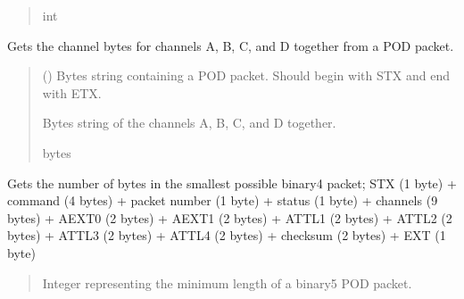 \documentclass[letterpaper,10pt,english]{sphinxmanual}
\begin{document}
\begin{fulllineitems}
\begin{fulllineitems}
\begin{quote}
\begin{description}
\sphinxAtStartPar
int

\end{description}\end{quote}

\end{fulllineitems}


\begin{fulllineitems}
\label{\detokenize{Morelia.Packets:Morelia.Packets.Binary5.PacketBinary5.GetChannels}}
\pysigstartsignatures
{}
\pysigstopsignatures
\sphinxAtStartPar
Gets the channel bytes for channels A, B, C, and D together from a POD packet.
\begin{quote}\begin{description}
\sphinxAtStartPar
{} () \textendash{} Bytes string containing a POD packet. Should begin with STX and                 end with ETX.

\sphinxAtStartPar
Bytes string of the channels A, B, C, and D together.

\sphinxAtStartPar
bytes

\end{description}\end{quote}

\end{fulllineitems}


\begin{fulllineitems}
\label{\detokenize{Morelia.Packets:Morelia.Packets.Binary5.PacketBinary5.GetMinimumLength}}
\pysigstartsignatures
{}
\pysigstopsignatures
\sphinxAtStartPar
Gets the number of bytes in the smallest possible binary4 packet;         STX (1 byte) + command (4 bytes) + packet number (1 byte) + status (1 byte)         + channels (9 bytes) + AEXT0 (2 bytes) + AEXT1 (2 bytes) + ATTL1 (2 bytes)         + ATTL2 (2 bytes) + ATTL3 (2 bytes) + ATTL4 (2 bytes) + checksum (2 bytes)         + EXT (1 byte)
\begin{quote}\begin{description}
\sphinxAtStartPar
Integer representing the minimum length of a binary5 POD packet.


\end{description}
\end{quote}
\end{fulllineitems}
\end{fulllineitems}
\end{document}
